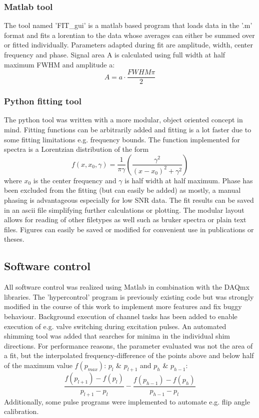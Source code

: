             \subsubsection{Matlab tool}
            The tool named 'FIT\_gui' is a matlab based program that loads data in the '.m' format and fits a lorentian to the data whose averages can either be summed over or fitted individually. Parameters adapted during fit are amplitude, width, center frequency and phase. Signal area A is calculated using full width at half maximum FWHM and amplitude a:
            \begin{equation}
                A=a\cdot\frac{FWHM\pi}{2}
            \end{equation}
            \subsubsection{Python fitting tool}
            The python tool was written with a more modular, object oriented concept in mind. Fitting functions can be arbitrarily added and fitting is a lot faster due to some fitting limitations e.g. frequency bounds. The function implemented for spectra is a Lorentzian distribution of the form
            \begin{equation}
                f(x,x_0, \gamma) = \frac{1}{\pi\gamma}\left(\frac{\gamma^2}{(x-x_0)^2+\gamma^2}\right)
            \end{equation}
            where $x_0$ is the center frequency and $\gamma$ is half width at half maximum.
            Phase has been excluded from the fitting (but can easily be added) as mostly, a manual phasing is advantageous especially for low SNR data. The fit results can be saved in an ascii file simplifying further calculations or plotting.
            The modular layout allows for reading of other filetypes as well such as bruker spectra or plain text files.
            Figures can easily be saved or modified for convenient use in publications or theses.
        \subsection{Software control}
            All software control was realized using Matlab in combination with the DAQmx libraries. The 'hypercontrol' program is previously existing code but was strongly modified in the course of this work to implement more features and fix buggy behaviour. Background execution of channel tasks has been added to enable execution of e.g. valve switching during excitation pulses. An automated shimming tool was added that searches for minima in the individual shim directions. For performance reasons, the parameter evaluated was not the area of a fit, but the interpolated frequency-difference of the points above and below half of the maximum value $f(p_{max})$: $p_l$ \& $p_{l+1}$ and $p_h$ \& $p_{h-1}$:
            \begin{equation}
                \frac{f(p_{l+1})-f(p_l)}{p_{l+1} - p_l}-\frac{f(p_{h-1})-f(p_h)}{p_{h-1} - p_l}
            \end{equation}
            Additionally, some pulse programs were implemented to automate e.g. flip angle calibration.
